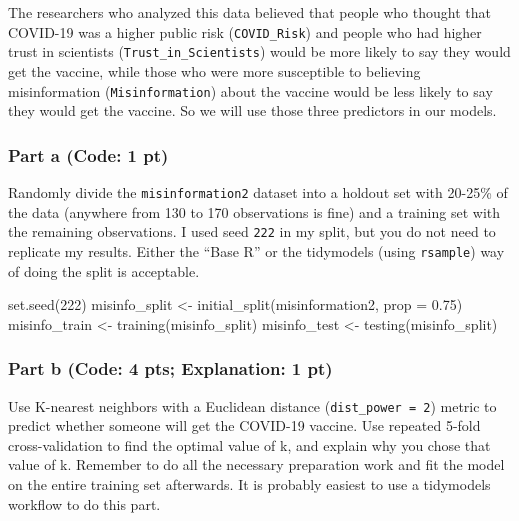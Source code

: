 \documentclass[
]{article}
\newenvironment{Shaded}{\begin{snugshade}}{\end{snugshade}}
\newcommand{\AttributeTok}[1]{\textcolor[rgb]{0.77,0.63,0.00}{#1}}
\newcommand{\DecValTok}[1]{\textcolor[rgb]{0.00,0.00,0.81}{#1}}
\newcommand{\FloatTok}[1]{\textcolor[rgb]{0.00,0.00,0.81}{#1}}
\newcommand{\FunctionTok}[1]{\textcolor[rgb]{0.00,0.00,0.00}{#1}}
\newcommand{\NormalTok}[1]{#1}
\newcommand{\OtherTok}[1]{\textcolor[rgb]{0.56,0.35,0.01}{#1}}
\begin{document}
The researchers who analyzed this data believed that people who thought
that COVID-19 was a higher public risk (\texttt{COVID\_Risk}) and people
who had higher trust in scientists (\texttt{Trust\_in\_Scientists})
would be more likely to say they would get the vaccine, while those who
were more susceptible to believing misinformation
(\texttt{Misinformation}) about the vaccine would be less likely to say
they would get the vaccine. So we will use those three predictors in our
models.

\hypertarget{part-a-code-1-pt}{%
\subsubsection{Part a (Code: 1 pt)}\label{part-a-code-1-pt}}

Randomly divide the \texttt{misinformation2} dataset into a holdout set
with 20-25\% of the data (anywhere from 130 to 170 observations is fine)
and a training set with the remaining observations. I used seed
\texttt{222} in my split, but you do not need to replicate my results.
Either the ``Base R'' or the tidymodels (using \texttt{rsample}) way of
doing the split is acceptable.

\begin{Shaded}
\begin{Highlighting}[]
\FunctionTok{set.seed}\NormalTok{(}\DecValTok{222}\NormalTok{)}
\NormalTok{misinfo\_split }\OtherTok{\textless{}{-}} \FunctionTok{initial\_split}\NormalTok{(misinformation2, }\AttributeTok{prop =} \FloatTok{0.75}\NormalTok{)}
\NormalTok{misinfo\_train }\OtherTok{\textless{}{-}} \FunctionTok{training}\NormalTok{(misinfo\_split)}
\NormalTok{misinfo\_test }\OtherTok{\textless{}{-}} \FunctionTok{testing}\NormalTok{(misinfo\_split)}
\end{Highlighting}
\end{Shaded}

\hypertarget{part-b-code-4-pts-explanation-1-pt}{%
\subsubsection{Part b (Code: 4 pts; Explanation: 1
pt)}\label{part-b-code-4-pts-explanation-1-pt}}

Use K-nearest neighbors with a Euclidean distance
(\texttt{dist\_power\ =\ 2}) metric to predict whether someone will get
the COVID-19 vaccine. Use repeated 5-fold cross-validation to find the
optimal value of k, and explain why you chose that value of k. Remember
to do all the necessary preparation work and fit the model on the entire
training set afterwards. It is probably easiest to use a tidymodels
workflow to do this part.
\end{document}
